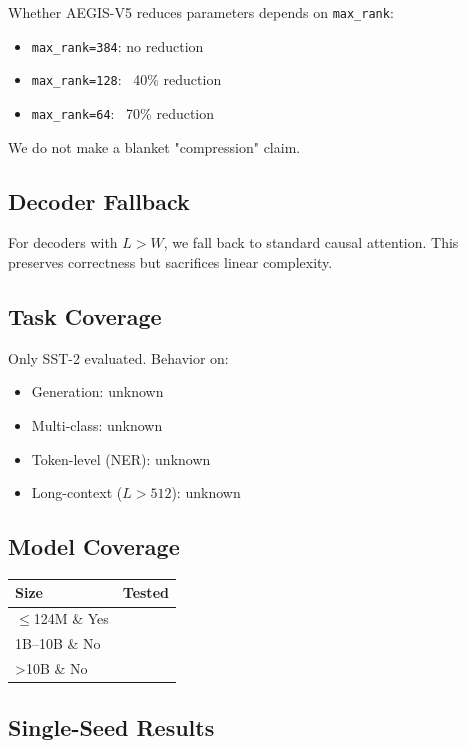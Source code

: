 Whether AEGIS-V5 reduces parameters depends on \texttt{max\_rank}:

\begin{itemize}
\item \texttt{max\_rank=384}: no reduction
\item \texttt{max\_rank=128}: ~40\% reduction
\item \texttt{max\_rank=64}: ~70\% reduction

\end{itemize}
We do not make a blanket "compression" claim.

\subsection{Decoder Fallback}

For decoders with $L > W$, we fall back to standard causal attention. This 
preserves correctness but sacrifices linear complexity.

\subsection{Task Coverage}

Only SST-2 evaluated. Behavior on:
\begin{itemize}
\item Generation: unknown
\item Multi-class: unknown
\item Token-level (NER): unknown
\item Long-context ($L > 512$): unknown

\end{itemize}
\subsection{Model Coverage}

\begin{table}[H]
\centering
\small
\begin{tabular}{ll}
\toprule
\textbf{Size} & \textbf{Tested} \\
\midrule
$\le$124M \& Yes \\
1B--10B \& No \\
>10B \& No \\
\bottomrule
\end{tabular}
\end{table}

\subsection{Single-Seed Results}

